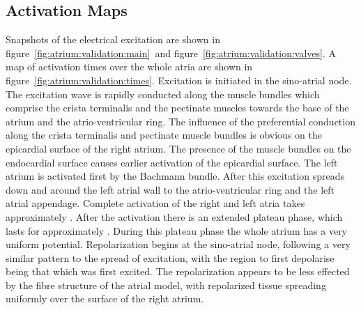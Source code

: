 \subsection{Activation Maps}

Snapshots of the electrical excitation are shown in
figure~\ref{fig:atrium:validation:main}\ and figure~\ref{fig:atrium:validation:valves}.
A map of activation times over the whole atria are shown in
figure~\ref{fig:atrium:validation:times}.
Excitation is initiated in the sino-atrial node.
The excitation wave is rapidly conducted along the muscle bundles which comprise
the crista terminalis and the pectinate muscles towards the base of the atrium
and the atrio-ventricular ring.
The influence of the preferential conduction along the crista terminalis and
pectinate muscle bundles is obvious on the epicardial surface of the right
atrium.
The presence of the muscle bundles on the endocardial surface causes earlier
activation of the epicardial surface.
The left atrium is activated first by the Bachmann bundle.
After this excitation spreads down and around the left atrial wall to the
atrio-ventricular ring and the left atrial appendage.
Complete activation of the right and left atria takes approximately .
After the activation there is an extended plateau phase, which lasts for
approximately .
During this plateau phase the whole atrium has a very uniform potential.
Repolarization begins at the sino-atrial node, following a very similar pattern
to the spread of excitation, with the region to first depolarise being that
which was first excited.
The repolarization appears to be less effected by the fibre structure of the
atrial model, with repolarized tissue spreading uniformly over the surface of
the right atrium.

